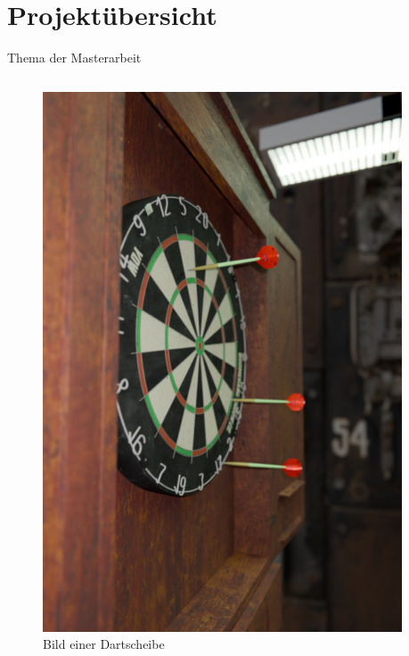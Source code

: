 \section{Projektübersicht}

\begin{frame}{Thema der Masterarbeit}
    \begin{columns}
        \begin{column}{0.4\linewidth}

            \begin{figure}
                \centering
                \includegraphics[height=0.7\textheight]{imgs/dartboard.png}
                \caption{Bild einer Dartscheibe}
            \end{figure}

        \end{column}
        \begin{column}{0.6\linewidth}


\end{column}
\end{columns}
\end{frame}
